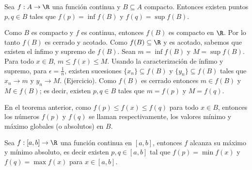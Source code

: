 \begin{teorema}
Sea $f:A\rightarrow \R$ una función continua y $B\subseteq A$ compacto. Entonces existen puntos $p, q \in B$ tales que $f(p)=\inf f(B)$ y $f(q)=\sup f(B)$. %
\end{teorema}

\begin{dem}
Como $B$ es compacto y $f$ es continua, entonces $f(B)$ es compacto en $\R$. %
Por lo tanto $f(B)$ es cerrado y acotado. %
Como $f(B) \subseteq \R$ y es acotado, sabemos que existen el ínfimo y supremo de $f(B)$. %
Sean $m=\inf f(B)$ y $M=\sup f(B)$. %
Para todo $x\in B$, $m\le f(x)\le M$. %
Usando la caracterización de ínfimo y supremo, para $\epsilon=\frac{1}{n}$, existen sucesiones $\{x_n\}\subseteq f(B)$ y $\{y_n\}\subseteq f(B)$ tales que $x_n\rightarrow m$ y $y_n\rightarrow M$. (Ejercicio). %
Como $f(B)$ es cerrado entonces $m\in f(B)$ y $M\in f(B)$; es decir, existen $p, q \in B$ tales que $m=f(p)$ y $M=f(q)$. %
\end{dem}

\begin{remark}
En el teorema anterior, como $f(p)\le f(x)\le f(q)$ para todo $x\in B$, entonces los números $f(p)$ y $f(q)$ se llaman respectivamente, los valores mínimo y máximo globales (o absolutos) en $B$. %
\end{remark}

\begin{teorema}
Sea $f:[a, b] \rightarrow \R$ una función continua en $[a, b]$, entonces $f$ alcanza su máximo y mínimo absoluto, es decir existen $p, q \in [a, b]$ tal que $f(p)=\min f(x)$ y $f(q)=\max f(x)$ para $x\in [a, b]$. %
\end{teorema}

\begin{center}
\end{center}

